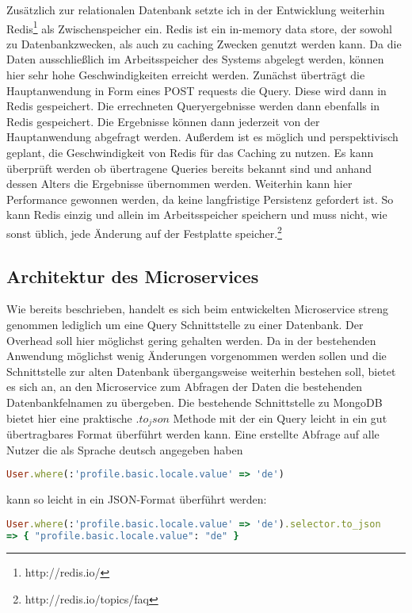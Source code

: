 Zusätzlich zur relationalen Datenbank setzte ich in der Entwicklung weiterhin Redis\footnote{http://redis.io/} als Zwischenspeicher ein. Redis ist ein in-memory data store, der sowohl zu Datenbankzwecken, als auch zu caching Zwecken genutzt werden kann. Da die Daten ausschließlich im Arbeitsspeicher des Systems abgelegt werden, können hier sehr hohe Geschwindigkeiten erreicht werden.
Zunächst überträgt die Hauptanwendung in Form eines POST requests die Query. Diese wird dann in Redis gespeichert. Die errechneten Queryergebnisse werden dann ebenfalls in Redis gespeichert. Die Ergebnisse können dann jederzeit von der Hauptanwendung abgefragt werden. Außerdem ist es möglich und perspektivisch geplant, die Geschwindigkeit von Redis für das Caching zu nutzen. Es kann überprüft werden ob übertragene Queries bereits bekannt sind und anhand dessen Alters die Ergebnisse übernommen werden. Weiterhin kann hier Performance gewonnen werden, da keine langfristige Persistenz gefordert ist. So kann Redis einzig und allein im Arbeitsspeicher speichern und muss nicht, wie sonst üblich, jede Änderung auf der Festplatte speicher.\footnote{http://redis.io/topics/faq}

\subsection{Architektur des Microservices}
Wie bereits beschrieben, handelt es sich beim entwickelten Microservice streng genommen lediglich um eine Query Schnittstelle zu einer Datenbank. Der Overhead soll hier möglichst gering gehalten werden. Da in der bestehenden Anwendung möglichst wenig Änderungen vorgenommen werden sollen und die Schnittstelle zur alten Datenbank übergangsweise weiterhin bestehen soll, bietet es sich an, an den Microservice zum Abfragen der Daten die bestehenden Datenbankfelnamen zu übergeben. Die bestehende Schnittstelle zu MongoDB bietet hier eine praktische $.to_json$ Methode mit der ein Query leicht in ein gut übertragbares Format überführt werden kann. Eine erstellte Abfrage auf alle Nutzer die als Sprache deutsch angegeben haben

\begin{lstlisting}[language=Ruby]
User.where(:'profile.basic.locale.value' => 'de')
\end{lstlisting}

\noindent kann so leicht in ein JSON-Format überführt werden:

\begin{lstlisting}[language=Ruby]
User.where(:'profile.basic.locale.value' => 'de').selector.to_json
=> { "profile.basic.locale.value": "de" }
\end{lstlisting}

